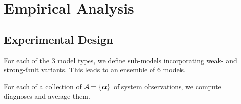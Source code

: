 \section{Empirical Analysis}

\subsection{Experimental Design}

For each of the 3 model types, we define sub-models incorporating weak- and strong-fault variants. This leads to an ensemble of 6 models.

For each of a collection of ${\cal A} = \{\vec{\alpha}\}$ of system observations, we compute diagnoses and average them.
